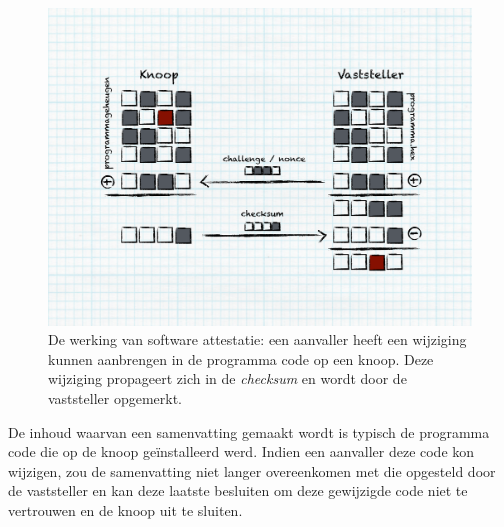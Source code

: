 \begin{figure}
  \centering
  \includegraphics[width=0.9\linewidth]{resources/attestation-process.pdf}
  \caption{De werking van software attestatie: een aanvaller heeft een
  wijziging kunnen aanbrengen in de programma code op een knoop. Deze wijziging
  propageert zich in de \emph{checksum} en wordt door de vaststeller opgemerkt.}
  \label{fig:attestation-process}
\end{figure}

De inhoud waarvan een samenvatting gemaakt wordt is typisch de programma code
die op de knoop ge\"installeerd werd. Indien een aanvaller deze code kon
wijzigen, zou de samenvatting niet langer overeenkomen met die opgesteld door
de vaststeller en kan deze laatste besluiten om deze gewijzigde code niet te
vertrouwen en de knoop uit te sluiten.

